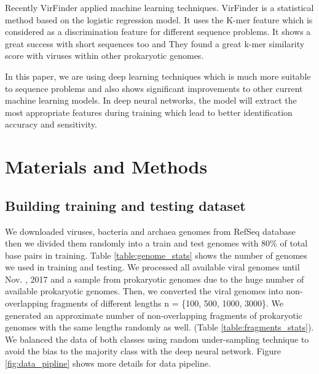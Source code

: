 \documentclass[10pt,journal,compsoc]{IEEEtran}
\begin{document}
Recently VirFinder \cite{ren2017virfinder} applied machine learning techniques. VirFinder is a statistical method based on the logistic regression model. It uses the K-mer feature which is considered as a discrimination feature for different sequence problems. It shows a great success with short sequences too and They found a great k-mer similarity score with viruses within other prokaryotic genomes. 


In this paper, we are using deep learning techniques which is much more suitable to sequence problems and also shows significant improvements to other current machine learning models. In deep neural networks, the model will extract the most appropriate features during training which lead to better identification accuracy and sensitivity. 

\section{Materials and Methods}

\subsection{Building training and testing dataset}
We downloaded viruses, bacteria and archaea genomes from RefSeq database then we divided them randomly into a train and test genomes with 80\% of total base pairs in training. Table \ref{table:genome_stats} shows the number of genomes we used in training and testing. We processed all available viral genomes until Nov. , 2017 and a sample from prokaryotic genomes due to the huge number of available prokaryotic genomes. Then, we converted the viral genomes into non-overlapping fragments of different lengths n = \{100, 500, 1000, 3000\}. We generated an approximate number of non-overlapping fragments of prokaryotic genomes with the same lengths randomly as well. (Table \ref{table:fragments_stats}). We balanced the data of both classes using random under-sampling technique to avoid the bias to the majority class with the deep neural network. Figure \ref{fig:data_pipline} shows more details for data pipeline.
\end{document}
